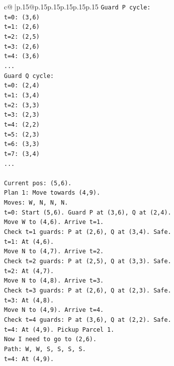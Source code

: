 \documentclass{article}
\begin{document}
{\begin{supertabular}{c@{$\;$}|p{.15\linewidth}@{}p{.15\linewidth}p{.15\linewidth}p{.15\linewidth}p{.15\linewidth}p{.15\linewidth}}
{{{\texttt{Guard P cycle:} \\
\texttt{t=0: (3,6)} \\
\texttt{t=1: (2,6)} \\
\texttt{t=2: (2,5)} \\
\texttt{t=3: (2,6)} \\
\texttt{t=4: (3,6)} \\
\texttt{...} \\
\texttt{Guard Q cycle:} \\
\texttt{t=0: (2,4)} \\
\texttt{t=1: (3,4)} \\
\texttt{t=2: (3,3)} \\
\texttt{t=3: (2,3)} \\
\texttt{t=4: (2,2)} \\
\texttt{t=5: (2,3)} \\
\texttt{t=6: (3,3)} \\
\texttt{t=7: (3,4)} \\
\texttt{...} \\
\\ 
\texttt{Current pos: (5,6).} \\
\texttt{Plan 1: Move towards (4,9).} \\
\texttt{Moves: W, N, N, N.} \\
\texttt{t=0: Start (5,6). Guard P at (3,6), Q at (2,4).} \\
\texttt{Move W to (4,6). Arrive t=1.} \\
\texttt{Check t=1 guards: P at (2,6), Q at (3,4). Safe.} \\
\texttt{t=1: At (4,6).} \\
\texttt{Move N to (4,7). Arrive t=2.} \\
\texttt{Check t=2 guards: P at (2,5), Q at (3,3). Safe.} \\
\texttt{t=2: At (4,7).} \\
\texttt{Move N to (4,8). Arrive t=3.} \\
\texttt{Check t=3 guards: P at (2,6), Q at (2,3). Safe.} \\
\texttt{t=3: At (4,8).} \\
\texttt{Move N to (4,9). Arrive t=4.} \\
\texttt{Check t=4 guards: P at (3,6), Q at (2,2). Safe.} \\
\texttt{t=4: At (4,9). Pickup Parcel 1.} \\
\texttt{Now I need to go to (2,6).} \\
\texttt{Path: W, W, S, S, S, S.} \\
\texttt{t=4: At (4,9).} \\
}}}
\end{supertabular}}
\end{document}
